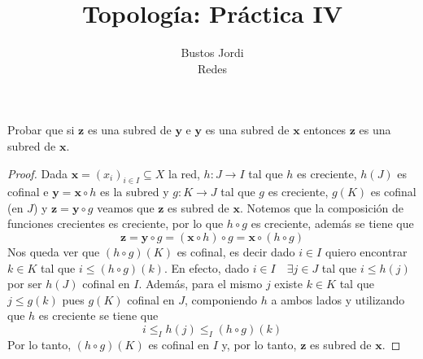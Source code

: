 \documentclass{article}
\theoremstyle{plain}
\theoremstyle{definition}
\newenvironment{ejercicio}[1]{\begin{trivlist}
\item[\hskip \labelsep {\bfseries Ejercicio}\hskip \labelsep {\bfseries #1.}]}{\end{trivlist}}
\begin{document}
\title{Topología: Práctica IV}
\author{Bustos Jordi\\Redes}

\maketitle

\begin{ejercicio}{1}
    Probar que si \( \mathbf{z} \) es una subred de \( \mathbf{y} \) e \( \mathbf{y} \) es una subred de \( \mathbf{x} \) entonces \( \mathbf{z} \) es una subred de \( \mathbf{x} \).
\end{ejercicio}
\begin{proof}
    Dada \( \mathbf{x} = {(x_i)}_{i \in I} \subseteq X \) la red, \( h : J \to I \) tal que \( h \) es creciente, \( h(J) \) es cofinal e \( \mathbf{y} = \mathbf{x} \circ h \) es la subred y \( g : K \to J \) tal que
    \( g \) es creciente, \( g(K) \) es cofinal (en \( J \)) y \( \mathbf{z} = \mathbf{y} \circ g \) veamos que \( \mathbf{z} \) es subred de \( \mathbf{x} \).
    Notemos que la composición de funciones crecientes es creciente, por lo que \( h \circ g \) es creciente, además se tiene que \[
        \mathbf{z} = \mathbf{y} \circ g = (\mathbf{x} \circ h) \circ g = \mathbf{x} \circ (h \circ g)
    \]
    Nos queda ver que \( (h \circ g)(K) \) es cofinal, es decir dado \( i \in I \) quiero encontrar \( k \in K \) tal que \( i \leq (h \circ g)(k) \).
    En efecto, dado \( i \in I \quad \exists j \in J \) tal que \( i \leq h(j) \) por ser \( h(J) \) cofinal en \( I \).
    Además, para el mismo \( j \) existe \( k \in K \) tal que \( j \leq g(k) \) pues \( g(K) \) cofinal en \( J \), componiendo \( h \) a ambos lados y utilizando que \( h \) es creciente se tiene que \[
        i \leq_I h(j) \leq_I (h \circ g)(k)
    \]
    Por lo tanto, \( (h \circ g)(K) \) es cofinal en \( I \) y, por lo tanto, \( \mathbf{z} \) es subred de \( \mathbf{x} \).
\end{proof}
\end{document}
